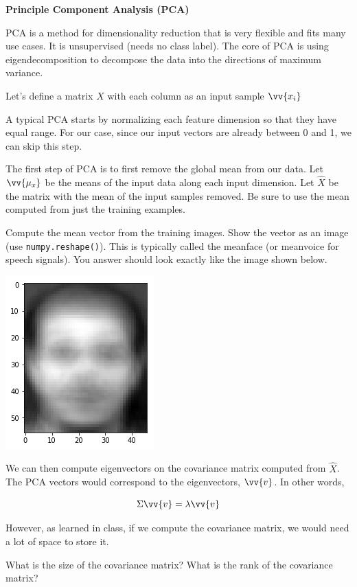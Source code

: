 \documentclass{article}
\newcounter{question}
\begin{document}
\textbf{Principle Component Analysis (PCA)}

PCA is a method for dimensionality reduction that is very flexible and fits many use cases. It is unsupervised (needs no class label). The core of PCA is using eigendecomposition to decompose the data into the directions of maximum variance.

Let's define a matrix $X$ with each column as an input sample $\vv{x_i}$

A typical PCA starts by normalizing each feature dimension so that they have equal range. For our case, since our input vectors are already between 0 and 1, we can skip this step.

The first step of PCA is to first remove the global mean from our data. Let $\vv{\mu_x}$ be the means of the input data along each input dimension. Let $\hat{X}$ be the matrix with the mean of the input samples removed. Be sure to use the mean computed from just the training examples.

\question Compute the mean vector from the training images. Show the vector as an image (use \texttt{numpy.reshape()}). This is typically called the meanface (or meanvoice for speech signals). You answer should look exactly like the image shown below.

\includegraphics[scale=0.5]{meanface.png}

We can then compute eigenvectors on the covariance matrix computed from $\hat{X}$. The PCA vectors would correspond to the eigenvectors, $\vv{v}$. In other words,

\begin{equation}
    \Sigma \vv{v} = \lambda \vv{v}
\end{equation}

However, as learned in class, if we compute the covariance matrix, we would need a lot of space to store it. 

\question What is the size of the covariance matrix? What is the rank of the covariance matrix?
\end{document}
